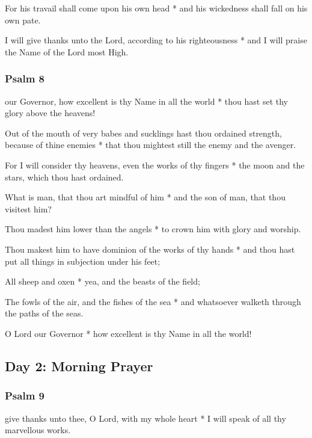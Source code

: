 For his travail shall come upon his own head * and his wickedness shall fall on his own pate.

I will give thanks unto the Lord, according to his righteousness * and I will praise the Name of the Lord most High.

\subsubsection{Psalm 8}


 our Governor, how excellent is thy Name in all the world * thou hast set thy glory above the heavens!

Out of the mouth of very babes and sucklings hast thou ordained strength, because of thine enemies * that thou mightest still the enemy and the avenger.

For I will consider thy heavens, even the works of thy fingers * the moon and the stars, which thou hast ordained.

What is man, that thou art mindful of him * and the son of man, that thou visitest him?

Thou madest him lower than the angels * to crown him with glory and worship.

Thou makest him to have dominion of the works of thy hands * and thou hast put all things in subjection under his feet;

All sheep and oxen * yea, and the beasts of the field;

The fowls of the air, and the fishes of the sea * and whatsoever walketh through the paths of the seas.

O Lord our Governor * how excellent is thy Name in all the world!

\subsection{Day 2: Morning Prayer}

\subsubsection{Psalm 9}


 give thanks unto thee, O Lord, with my whole heart * I will speak of all thy marvellous works.


